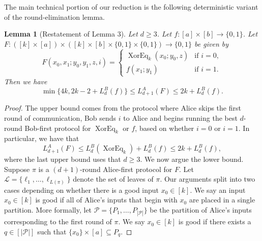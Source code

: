\documentclass[10pt,a4paper]{article}
\newtheorem{lemma}[theorem]{Lemma}
\newcommand{\XorEq}{\operatorname{XorEq}}
\begin{document}
The main technical portion of our reduction is the following deterministic variant of the round-elimination lemma.
\begin{lemma}[Restatement of Lemma 3]\label{lem:round-elimination}
Let $d\ge3$. Let $f:[a]\times[b]\to\{0,1\}$. Let $F:([k]\times[a])\times([k]\times[b]\times\{0,1\}\times\{0,1\})\to\{0,1\}$ be given by
\[F(x_0,x_1;y_0,y_1,z,i)=\begin{cases}\XorEq_k(x_0;y_0,z)&\text{if }i=0,\\f(x_1;y_1)&\text{if }i=1.\end{cases}\]
Then we have
\[\min\{4k,2k-2+L_d^B(f)\}\le L_{d+1}^A(F)\le2k+L_d^B(f).\]
\end{lemma}
\begin{proof}
The upper bound comes from the protocol where Alice skips the first round of communication, Bob sends $i$ to Alice and begins running the best $d$-round Bob-first protocol for $\XorEq_k$ or $f$, based on whether $i=0$ or $i=1$. In particular, we have that
\[L_{d+1}^A(F)\le L_d^B(\XorEq_k)+L_d^B(f)\le2k+L_d^B(f),\]
where the last upper bound uses that $d\ge3$.
We now argue the lower bound. Suppose $\pi$ is a $(d+1)$-round Alice-first protocol for $F$. Let $\mathcal L=\{\ell_1,\ldots,\ell_{L(\pi)}\}$ denote the set of leaves of $\pi$.
Our arguments split into two cases depending on whether there is a good input $x_0\in[k]$. We say an input $x_0\in[k]$ is good if all of Alice's inputs that begin with $x_0$ are placed in a single partition. More formally, let $\mathcal P=\{P_1,\ldots,P_{|\mathcal P|}\}$ be the partition of Alice's inputs corresponding to the first round of $\pi$. We say $x_0\in[k]$ is good if there exists a $q\in[|\mathcal P|]$ such that $\{x_0\}\times[a]\subseteq P_q$.

\end{proof}
\end{document}

